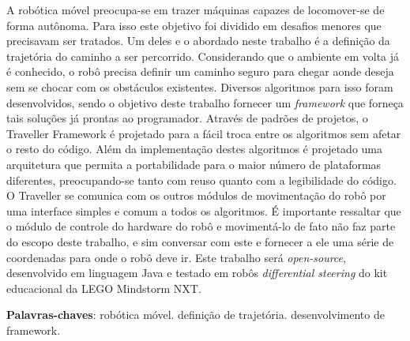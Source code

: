 \begin{resumo}
A robótica móvel preocupa-se em trazer máquinas capazes de locomover-se de forma autônoma. Para isso este objetivo foi dividido em desafios menores que precisavam ser tratados. Um deles e o abordado neste trabalho é a definição da trajetória do caminho a ser percorrido. Considerando que o ambiente em volta já é conhecido, o robô precisa definir um caminho seguro para chegar aonde deseja sem se chocar com os obstáculos existentes. Diversos algoritmos para isso foram desenvolvidos, sendo o objetivo deste trabalho fornecer um \textit{framework} que forneça tais soluções já prontas ao programador. Através de padrões de projetos, o Traveller Framework é projetado para a fácil troca entre os algoritmos sem afetar o resto do código. Além da implementação destes algoritmos é projetado uma arquitetura que permita a portabilidade para o maior número de plataformas diferentes, preocupando-se tanto com reuso quanto com a legibilidade do código. O Traveller se comunica com os outros módulos de movimentação do robô por uma interface simples e comum a todos os algoritmos. É importante ressaltar que o módulo de controle do hardware do robô e movimentá-lo de fato não faz parte do escopo deste trabalho, e sim conversar com este e fornecer a ele uma série de coordenadas para onde o robô deve ir. Este trabalho será \textit{open-source}, desenvolvido em linguagem Java e testado em robôs \textit{differential steering} do kit educacional da LEGO Mindstorm NXT.

 \vspace{\onelineskip}
    
 \noindent
 \textbf{Palavras-chaves}: robótica móvel. definição de trajetória. desenvolvimento de framework.
\end{resumo}

